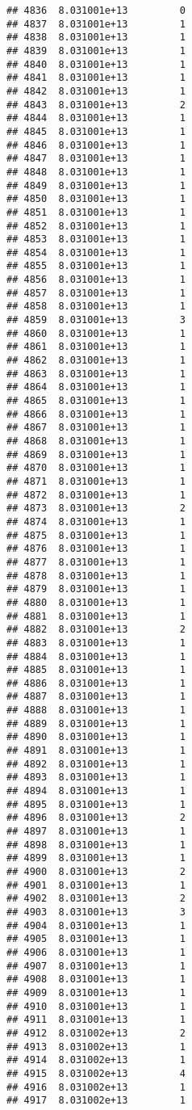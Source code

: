 \documentclass[
]{article}
\begin{document}
\begin{verbatim}
## 4836  8.031001e+13         0
## 4837  8.031001e+13         1
## 4838  8.031001e+13         1
## 4839  8.031001e+13         1
## 4840  8.031001e+13         1
## 4841  8.031001e+13         1
## 4842  8.031001e+13         1
## 4843  8.031001e+13         2
## 4844  8.031001e+13         1
## 4845  8.031001e+13         1
## 4846  8.031001e+13         1
## 4847  8.031001e+13         1
## 4848  8.031001e+13         1
## 4849  8.031001e+13         1
## 4850  8.031001e+13         1
## 4851  8.031001e+13         1
## 4852  8.031001e+13         1
## 4853  8.031001e+13         1
## 4854  8.031001e+13         1
## 4855  8.031001e+13         1
## 4856  8.031001e+13         1
## 4857  8.031001e+13         1
## 4858  8.031001e+13         1
## 4859  8.031001e+13         3
## 4860  8.031001e+13         1
## 4861  8.031001e+13         1
## 4862  8.031001e+13         1
## 4863  8.031001e+13         1
## 4864  8.031001e+13         1
## 4865  8.031001e+13         1
## 4866  8.031001e+13         1
## 4867  8.031001e+13         1
## 4868  8.031001e+13         1
## 4869  8.031001e+13         1
## 4870  8.031001e+13         1
## 4871  8.031001e+13         1
## 4872  8.031001e+13         1
## 4873  8.031001e+13         2
## 4874  8.031001e+13         1
## 4875  8.031001e+13         1
## 4876  8.031001e+13         1
## 4877  8.031001e+13         1
## 4878  8.031001e+13         1
## 4879  8.031001e+13         1
## 4880  8.031001e+13         1
## 4881  8.031001e+13         1
## 4882  8.031001e+13         2
## 4883  8.031001e+13         1
## 4884  8.031001e+13         1
## 4885  8.031001e+13         1
## 4886  8.031001e+13         1
## 4887  8.031001e+13         1
## 4888  8.031001e+13         1
## 4889  8.031001e+13         1
## 4890  8.031001e+13         1
## 4891  8.031001e+13         1
## 4892  8.031001e+13         1
## 4893  8.031001e+13         1
## 4894  8.031001e+13         1
## 4895  8.031001e+13         1
## 4896  8.031001e+13         2
## 4897  8.031001e+13         1
## 4898  8.031001e+13         1
## 4899  8.031001e+13         1
## 4900  8.031001e+13         2
## 4901  8.031001e+13         1
## 4902  8.031001e+13         2
## 4903  8.031001e+13         3
## 4904  8.031001e+13         1
## 4905  8.031001e+13         1
## 4906  8.031001e+13         1
## 4907  8.031001e+13         1
## 4908  8.031001e+13         1
## 4909  8.031001e+13         1
## 4910  8.031001e+13         1
## 4911  8.031001e+13         1
## 4912  8.031002e+13         2
## 4913  8.031002e+13         1
## 4914  8.031002e+13         1
## 4915  8.031002e+13         4
## 4916  8.031002e+13         1
## 4917  8.031002e+13         1

\end{verbatim}
\end{document}
